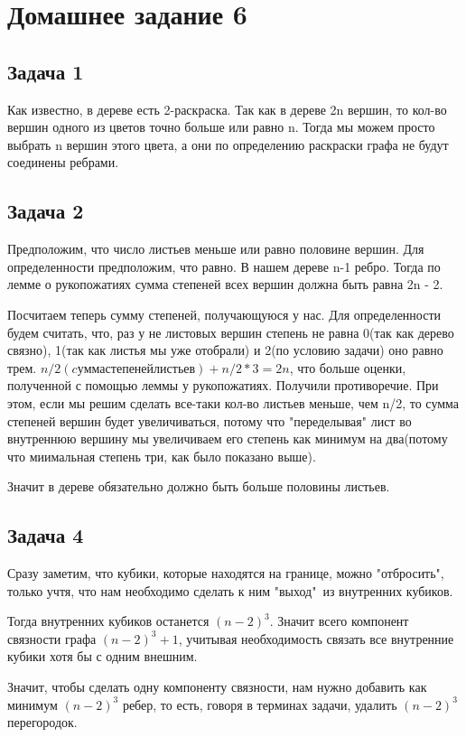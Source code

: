 

	\section{Домашнее задание 6} 
	\subsection{Задача 1} 
	Как известно, в дереве есть 2-раскраска. Так как в дереве 2n вершин, то кол-во вершин одного из цветов точно больше или равно n. Тогда мы можем просто выбрать n вершин этого цвета, а они по определению раскраски графа не будут соединены ребрами.
	
	\subsection{Задача 2} 
	Предположим, что число листьев меньше или равно половине вершин. Для определенности предположим, что равно. В нашем дереве n-1 ребро. Тогда по лемме о рукопожатиях сумма степеней всех вершин должна быть равна 2n - 2.
	
	Посчитаем теперь сумму степеней, получающуюся у нас. Для определенности будем считать, что, раз у не листовых вершин степень не равна 0(так как дерево связно), 1(так как листья мы уже отобрали) и 2(по условию задачи) оно равно трем. $n/2(cумма степеней листьев) + n/2*3 = 2n$, что больше оценки, полученной с помощью леммы у рукопожатиях. Получили противоречие. При этом, если мы решим сделать все-таки кол-во листьев меньше, чем n/2, то сумма степеней вершин будет увеличиваться, потому что "переделывая" лист во внутреннюю вершину мы увеличиваем его степень как минимум на два(потому что миимальная степень три, как было показано выше).
	
	Значит в дереве обязательно должно быть больше половины листьев.
	
	\subsection{Задача 4}
	Сразу заметим, что кубики, которые находятся на границе, можно "отбросить", только учтя, что  нам необходимо сделать к ним "выход"\ из внутренних кубиков. 
	
	Тогда внутренних кубиков останется $(n-2)^3$. Значит всего компонент связности графа $(n-2)^3 + 1$, учитывая необходимость связать все внутренние кубики хотя бы с одним внешним.
	
	Значит, чтобы сделать одну компоненту связности, нам нужно добавить как минимум $(n-2)^3$ ребер, то есть, говоря в терминах задачи, удалить $(n-2)^3$ перегородок.
	
